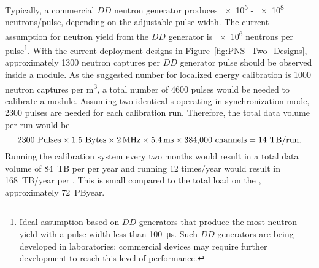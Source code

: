 Typically, a commercial $DD$ neutron generator produces \num{e5} - \num{e8} neutrons/pulse, depending on the adjustable pulse width. The current assumption for neutron yield from the $DD$ generator is \num{e6} neutrons per pulse\footnote{Ideal assumption based on $DD$ generators that produce the most neutron yield with a pulse width less than \SI{100}{\micro\s}. Such $DD$ generators are being developed in laboratories; commercial devices may require further development to reach this level of performance.}. With the current deployment designs in Figure~\ref{fig:PNS_Two_Designs}, approximately \num{1300} neutron captures per $DD$ generator pulse should be observed inside a \nominalmodsize module. As the suggested number for localized energy calibration is \num{1000} neutron captures per \si{\cubic\m}, a total number of \num{4600} pulses would be needed to calibrate a \nominalmodsize module. Assuming two identical s operating in synchronization mode, \num{2300} pulses are needed for each calibration run. Therefore, the total data volume per run would be
\begin{equation}
\num{2300}~{\rm Pulses} \times \num{1.5}~{\rm Bytes}\times
\SI{2}{\mega\hertz}\times \SI{5.4}{\milli\s}\times \num{384000}~{\rm channels} = \num{14}~{\rm TB/run}.
\end{equation}
Running the  calibration system every two months would result in a total data volume of \SI{84}{TB} per \nominalmodsize per year and running \num{12} times/year would result in \num{168}~TB/year per \nominalmodsize. This is small compared to the total load on the , approximately \SI{72}{PByear}.




